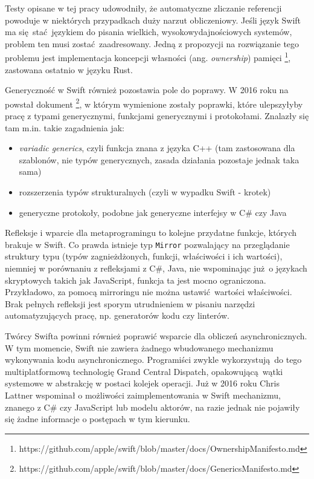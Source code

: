 \documentclass[mgr, shortabstract]{iithesis}
\newcommand{\ang}[1]{ang. \textit{#1}}
\newcommand{\swiftinline}[1]{
    \texttt{#1}
}
\begin{document}
Testy opisane w tej pracy udowodniły, że automatyczne zliczanie referencji powoduje w niektórych przypadkach duży narzut obliczeniowy. Jeśli język Swift ma się stać językiem do pisania wielkich, wysokowydajnościowych systemów, problem ten musi zostać zaadresowany. Jedną z propozycji na rozwiązanie tego problemu jest implementacja koncepcji własności (\ang{ownership}) pamięci \footnote{https://github.com/apple/swift/blob/master/docs/OwnershipManifesto.md}, zastowana ostatnio w języku Rust. 

Generyczność w Swift również pozostawia pole do poprawy. W 2016 roku na powstał dokument \footnote{https://github.com/apple/swift/blob/master/docs/GenericsManifesto.md}, w którym wymienione zostały poprawki, które ulepszyłyby pracę z typami generycznymi, funkcjami generycznymi i protokołami. Znalazły się tam m.in. takie zagadnienia jak:
\begin{itemize}
    \item \textit{variadic generics}, czyli funkcja znana z języka C++ (tam zastosowana dla szablonów, nie typów generycznych, zasada działania pozostaje jednak taka sama)
    \item rozszerzenia typów strukturalnych (czyli w wypadku Swift - krotek)
    \item generyczne protokoły, podobne jak generyczne interfejsy w C\# czy Java
\end{itemize}

Refleksje i wparcie dla metaprogramingu to kolejne przydatne funkcje, których brakuje w Swift. Co prawda istnieje typ \swiftinline{Mirror} pozwalający na przeglądanie struktury typu (typów zagnieżdżonych, funkcji, właściwości i ich wartości), niemniej w porównaniu z refleksjami z C\#, Java, nie wspominając już o językach skryptowych takich jak JavaScript, funkcja ta jest mocno ograniczona. Przykładowo, za pomocą mirroringu nie można ustawić wartości właściwości. Brak pełnych refleksji jest sporym utrudnieniem w pisaniu narzędzi automatyzujących pracę, np.  generatorów kodu czy linterów.

Twórcy Swifta powinni również poprawić wsparcie dla obliczeń asynchronicznych. W tym momencie, Swift nie zawiera żadnego wbudowanego mechanizmu wykonywania kodu asynchronicznego. Programiści zwykle wykorzystują do tego multiplatformową technologię Grand Central Dispatch, opakowującą wątki systemowe w abstrakcję w postaci kolejek operacji. Już w 2016 roku Chris Lattner wspominał o możliwości zaimplementowania w Swift mechanizmu, znanego z C\# czy JavaScript lub modelu aktorów, na razie jednak nie pojawiły się żadne informacje o postępach w tym kierunku.
\end{document}
